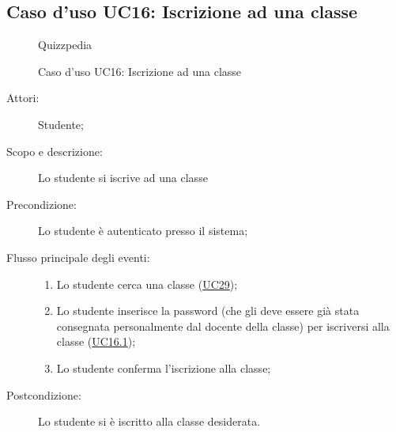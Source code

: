 \subsection{Caso d'uso UC16: Iscrizione ad una classe}
        \begin{figure}[H]
            \centering
            \begin{resizedtikzpicture}{\textwidth}
		\begin{umlsystem}[x=0, fill=lightgray!20]{Quizzpedia}
		\end{umlsystem}
            \end{resizedtikzpicture}
            \caption{Caso d'uso UC16: Iscrizione ad una classe}
            \label{fig:UC16} 
        \end{figure}
    \begin{description}
\item[Attori:] Studente;
\item[Scopo e descrizione:] Lo studente si iscrive ad una classe
      \item[Precondizione:] Lo studente è autenticato presso il sistema;

        \item[Flusso principale degli eventi:] \begin{enumerate}
          \item Lo studente cerca una classe (\hyperlink{UC29}{UC29});
          \item Lo studente inserisce la password (che gli deve essere già stata consegnata personalmente dal docente della classe) per iscriversi alla classe (\hyperlink{UC16.1}{UC16.1});
          \item Lo studente conferma l'iscrizione alla classe;

      \end{enumerate}
    \item[Postcondizione:] Lo studente si è iscritto alla classe desiderata.
  \end{description}
\hypertarget{UC16.1}{}
